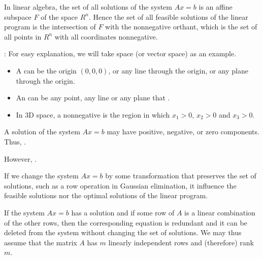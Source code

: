    \par In linear algebra, the set of all solutions of the system $Ax = b$ is an affine subspace $F$ of the space $R^n$. Hence the set of all feasible solutions of the linear program is the intersection of $F$ with the nonnegative orthant, which is the set of all points in $R^n$ with all coordinates nonnegative.
    \par {}: For easy explanation, we will take  space (or vector space) as an example.
    \begin{itemize}
      \item A  can be the origin $(0, 0, 0)$, or any line through the origin, or any plane through the origin.
      \item An  can be any point, any line or any plane that .
      \item In 3D space, a nonnegative  is the region in which $x_1 > 0$, $x_2 > 0$ and $x_3 > 0$.
    \end{itemize}


    \par A solution of the system $Ax = b$ may have positive, negative, or zero components. Thus, .
    \par However, .
    \par If we change the system $Ax = b$ by some transformation that preserves the set of solutions, such as a row operation in Gaussian elimination, it  influence the feasible solutions nor the optimal solutions of the linear program.
    \par If the system $Ax = b$ has a solution and if some row of $A$ is a linear combination of the other rows, then the corresponding equation is redundant and it can be deleted from the system without changing the set of solutions. We may thus assume that the matrix $A$ has $m$ linearly independent rows and (therefore) rank $m$.

    \vspace{0.75cm}

    \par {}

